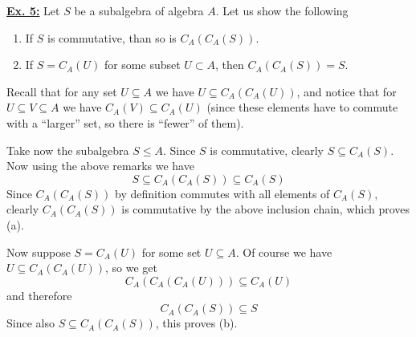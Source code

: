 \documentclass[a4paper, 12pt]{article}
\begin{document}
\underline{\textbf{Ex. 5:}}
Let $S$ be a subalgebra of algebra $A$.
Let us show the following
\begin{enumerate}[label=(\alph*)]
    \item If $S$ is commutative, than so is $C_A(C_A(S))$.
    \item If $S = C_A(U)$ for some subset $U \subset A$, then $C_A(C_A(S)) = S$.
\end{enumerate}

Recall that for any set $U \subseteq A$ we have $U \subseteq C_A(C_A(U))$, and notice that for $U \subseteq V \subseteq A$ we have $C_A(V) \subseteq C_A(U)$ (since these elements have to commute with a ``larger'' set, so there is ``fewer'' of them).

Take now the subalgebra $S \leq A$. Since $S$ is commutative, clearly $S \subseteq C_A(S)$. Now using the above remarks we have
\[
    S \subseteq C_A(C_A(S)) \subseteq C_A(S)
\]
Since $C_A(C_A(S))$ by definition commutes with all elements of $C_A(S)$, clearly $C_A(C_A(S))$ is commutative by the above inclusion chain, which proves (a).

Now suppose $S = C_A(U)$ for some set $U \subseteq A$. Of course we have $U \subseteq C_A(C_A(U))$, so we get
\[
    C_A(C_A(C_A(U))) \subseteq C_A(U)
\]
and therefore
\[
    C_A(C_A(S)) \subseteq S
\]
Since also $S \subseteq C_A(C_A(S))$, this proves (b).
\end{document}
